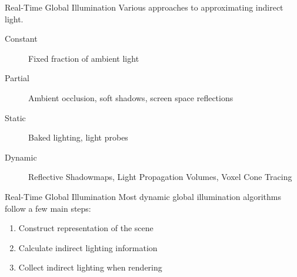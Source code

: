 \documentclass[10pt]{beamer}
\begin{document}
\begin{frame}{Real-Time Global Illumination}
  Various approaches to approximating indirect light.

  \begin{description}
    \item[Constant] Fixed fraction of ambient light %
    \item[Partial] Ambient occlusion, soft shadows, screen space reflections %
    \item[Static] Baked lighting, light probes
    \item[Dynamic] Reflective Shadowmaps, Light Propagation Volumes, Voxel Cone Tracing
  \end{description}
\end{frame}

\begin{frame}{Real-Time Global Illumination}
  Most dynamic global illumination algorithms follow a few main steps:

  \begin{enumerate}
    \item Construct representation of the scene
    \item Calculate indirect lighting information
    \item Collect indirect lighting when rendering
  \end{enumerate}

\end{frame}
\end{document}
